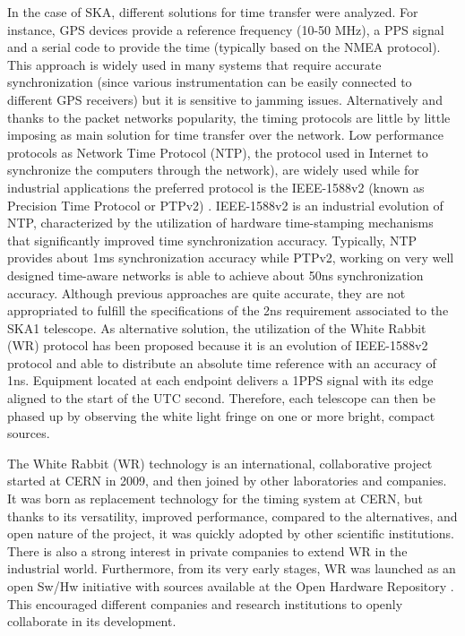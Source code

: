 In the case of SKA, different solutions for time transfer were analyzed. For instance, GPS devices provide a reference frequency (10-50 MHz), a PPS signal and a serial code to provide the time (typically based on the NMEA protocol). This approach is widely used in many systems that require accurate synchronization (since various instrumentation can be easily connected to different GPS receivers) but it is sensitive to jamming issues. Alternatively and thanks to the packet networks popularity, the timing protocols are little by little imposing as main solution for time transfer over the network. Low performance protocols as Network Time Protocol (NTP), the protocol used in Internet to synchronize the computers through the network), \cite{ntf:ntp_std} are widely used while for industrial applications the preferred protocol is the IEEE-1588v2 (known as Precision Time Protocol or PTPv2) \cite{ieee:ieee1588_std} \cite{itu:TG8275_1_Y_1369_1}. IEEE-1588v2 is an industrial evolution of NTP, characterized by the utilization of hardware time-stamping mechanisms that significantly improved time synchronization accuracy. Typically, NTP provides about 1ms synchronization accuracy while PTPv2, working on very well designed time-awa\textsf{}re networks is able to achieve about 50ns synchronization accuracy. 
Although previous approaches are quite accurate, they are not appropriated to fulfill the specifications of the 2ns requirement associated to the SKA1 telescope. As alternative solution, the utilization of the White Rabbit (WR) protocol has been proposed because it is an evolution of IEEE-1588v2 protocol and able to distribute an absolute time reference with an accuracy of 1ns. Equipment located at each endpoint delivers a 1PPS signal with its edge aligned to the start of the UTC second. Therefore, each telescope can then be phased up by observing the white light fringe on one or more bright, compact sources.

The White Rabbit (WR) technology is an international, collaborative project started at CERN in 2009, and then joined by other laboratories and companies. It was born as replacement technology for the timing system at CERN, but thanks to its versatility, improved performance, compared to the alternatives, and open nature of the project, it was quickly adopted by other scientific institutions. There is also a strong interest in private companies to extend WR in the  industrial world. Furthermore, from its very early stages, WR was launched as an open Sw/Hw initiative with sources available at the Open Hardware Repository \cite{ohwr:repo}. This encouraged different companies and research institutions to openly collaborate in its development.

